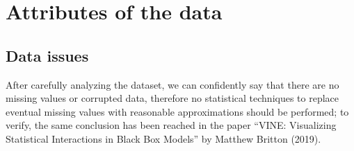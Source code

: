 \documentclass[11pt,a4paper]{article}
\begin{document}
\section{Attributes of the data}

\subsection{Data issues}

After carefully analyzing the dataset, we can confidently say that there are no missing values or corrupted data, therefore no statistical techniques to replace eventual missing values with reasonable approximations should be performed; to verify, the same conclusion has been reached in the paper “VINE: Visualizing Statistical Interactions in Black Box Models” by Matthew Britton (2019).
\end{document}

